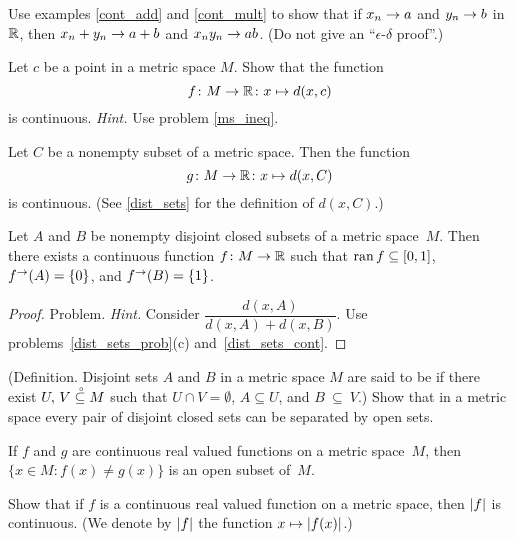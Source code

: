 \begin{prob} Use examples \ref{cont_add} and \ref{cont_mult} to show that if $x_n \rightarrow a$ and
$y_n \rightarrow b$ in~$\mathbb{R}$, then $x_n + y_n \rightarrow a + b$ and $x_ny_n \rightarrow ab$. (Do not give an
``$\epsilon$-$\delta$ proof''.)
\end{prob}

\begin{prob} Let $c$ be a point in a metric space $M$.  Show that the function
  \[ f \colon M \rightarrow \mathbb{R} \colon  x \mapsto d(x,c) \]
is continuous. \emph{Hint.} Use problem \ref{ms_ineq}.
\end{prob}

\begin{prob}\label{dist_sets_cont}  Let $C$ be a nonempty subset of a metric space.  Then the
function
  \[ g \colon M \rightarrow \mathbb{R} \colon  x \mapsto d(x,C) \]
is continuous.  (See \ref{dist_sets} for the definition of $d(x,C)$.)
\end{prob}

\begin{prop}\label{prob_urys_lem} Let $A$ and $B$ be nonempty disjoint closed
subsets of a metric space~$M$.  Then there exists a continuous function $f \colon M \rightarrow \mathbb{R}$
such that $\operatorname{ran} f \subseteq [0,1]$, $f^{\rightarrow}(A) = \{0\}$, and $f^{\rightarrow}(B) = \{1\}$.
\end{prop}

\begin{proof} Problem.  \emph{Hint.} Consider $\dfrac{d(x,A)}{d(x,A) + d(x,B)}$.  Use
problems~\ref{dist_sets_prob}(c) and~\ref{dist_sets_cont}.  \ns
\end{proof}

\begin{prob} (Definition. Disjoint sets $A$ and $B$ in a metric space $M$ are said to be
 if there exist $U,\,V\overset{\thickspace{}_\circ}{\subseteq}M$ such that $U \cap V = \emptyset$,
$A \subseteq U$, and $B~\subseteq~V$.) Show that in a metric space every pair of disjoint
closed sets can be separated by open sets.
\end{prob}

\begin{prob} If $f$ and $g$ are continuous real valued functions on a metric space~$M$, then
$\{x \in M\colon  f(x) \ne g(x)\}$ is an open subset of~$M$.
\end{prob}

\begin{prob} Show that if $f$ is a continuous real valued function on a metric space,
then $\lvert f\rvert$ is continuous.  (We denote by $\lvert f\rvert$ the function $x \mapsto \lvert f(x)\rvert$.)
\end{prob}

